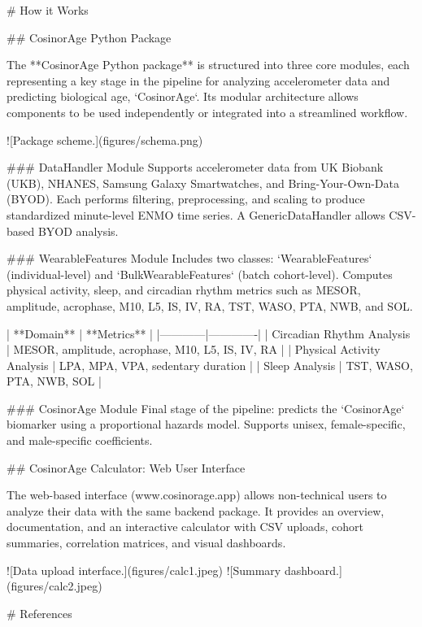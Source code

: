 # How it Works

## CosinorAge Python Package

The **CosinorAge Python package** is structured into three core modules, each representing a key stage in the pipeline for analyzing accelerometer data and predicting biological age, `CosinorAge`. Its modular architecture allows components to be used independently or integrated into a streamlined workflow.  

![Package scheme.\label{fig:Fig2}](figures/schema.png)

### DataHandler Module
Supports accelerometer data from UK Biobank (UKB), NHANES, Samsung Galaxy Smartwatches, and Bring-Your-Own-Data (BYOD). Each performs filtering, preprocessing, and scaling to produce standardized minute-level ENMO time series. A GenericDataHandler allows CSV-based BYOD analysis.  

### WearableFeatures Module
Includes two classes: `WearableFeatures` (individual-level) and `BulkWearableFeatures` (batch cohort-level). Computes physical activity, sleep, and circadian rhythm metrics such as MESOR, amplitude, acrophase, M10, L5, IS, IV, RA, TST, WASO, PTA, NWB, and SOL.  

| **Domain** | **Metrics** |
|------------|-------------|
| Circadian Rhythm Analysis | MESOR, amplitude, acrophase, M10, L5, IS, IV, RA |
| Physical Activity Analysis | LPA, MPA, VPA, sedentary duration |
| Sleep Analysis | TST, WASO, PTA, NWB, SOL |

### CosinorAge Module
Final stage of the pipeline: predicts the `CosinorAge` biomarker using a proportional hazards model. Supports unisex, female-specific, and male-specific coefficients.  

## CosinorAge Calculator: Web User Interface

The web-based interface (www.cosinorage.app) allows non-technical users to analyze their data with the same backend package. It provides an overview, documentation, and an interactive calculator with CSV uploads, cohort summaries, correlation matrices, and visual dashboards.  

![Data upload interface.\label{fig:Fig3}](figures/calc1.jpeg)
![Summary dashboard.\label{fig:Fig4}](figures/calc2.jpeg)

# References